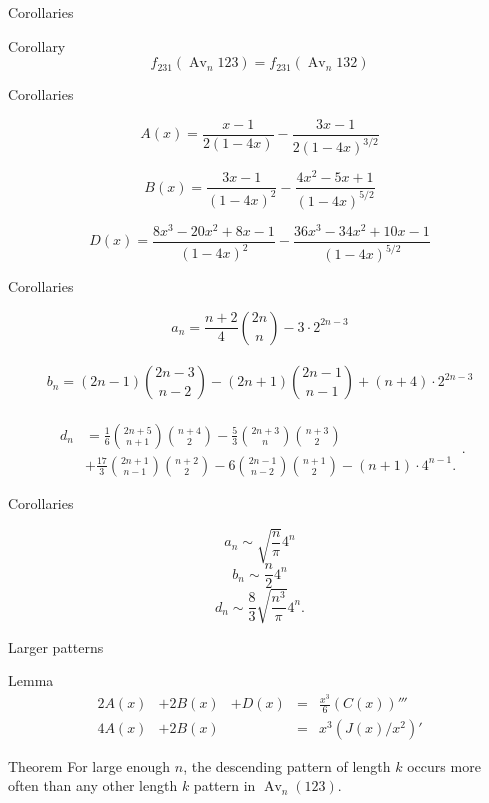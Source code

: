 \documentclass[xcolor=dvipsnames]{beamer}
\DeclareMathOperator{\Av}{Av}
\newcommand{\Avn}{\Av_n(123)}
\newcommand{\num}{f}
\begin{document}
\begin{frame}{Corollaries}
  \pause
  \begin{block}{Corollary}
    $$ \num_{231}(\Av_n 123) = \num_{231}(\Av_n 132)$$
  \end{block}
\end{frame}


\begin{frame}{Corollaries}

    $$ A(x) = \frac{x-1}{2(1-4x)} - \frac{3x-1}{2(1-4x)^{3/2}}$$

    $$B(x) = \frac{3x-1}{(1-4x)^{2}} - \frac{4x^2 - 5x +
    1}{(1-4x)^{5/2}}$$

    $$ D(x) =   \frac{ 8x^3 - 20x^2 + 8x - 1}{(1-4x)^{2}} 
      - \frac{36x^3 - 34x^2 + 10x - 1}{(1-4x)^{5/2}} $$ 

\end{frame}




\begin{frame}{Corollaries}

  $$ a_n = \frac{n+2}{4} \binom{2n}{n} - 3 \cdot 2^{2n-3} $$\\[.5pc]
  $$ b_n = (2n-1) \binom{2n-3}{n-2} - (2n+1)\binom{2n-1}{n-1} + 
     (n+4) \cdot 2^{2n-3}$$\\[.5pc]
  $$ \begin{aligned} d_n 
      &= \frac{1}{6} \binom{2n+5}{n+1} \binom{n+4}{2} 
      - \frac{5}{3} \binom{2n+3}{n} \binom{n+3}{2} \\
      &+ \frac{17}{3} \binom{2n+1}{n-1} \binom{n+2}{2} 
      - 6\binom{2n-1}{n-2} \binom{n+1}{2} - (n+1) \cdot 4^{n-1}.
    \end{aligned}
  .$$

\end{frame}


\begin{frame}{Corollaries}

  $$ a_n \sim \sqrt{\frac{n}{\pi}} 4^n$$
  $$ b_n \sim \frac{n}{2} 4^n $$
  $$ d_n \sim \frac{8}{3} \sqrt{\frac{n^3}{\pi}} 4^n. $$

\end{frame}


\begin{frame}{Larger patterns}
  \pause
  \begin{block}{Lemma}
    $$ \begin{array}{ccccc}
      2A(x) & + 2B(x) & + D(x) & = & \frac{x^3}{6} (C(x))'''\\
      4A(x) & + 2B(x) & & =&  x^3(J(x)/x^2)' 
      \end{array} $$
  \end{block}
  \pause
  \begin{block}{Theorem}
    For large enough $n$, the descending pattern of length $k$ occurs
    more often than any other length $k$ pattern in $\Avn$. 
  \end{block}
\end{frame}
\end{document}
